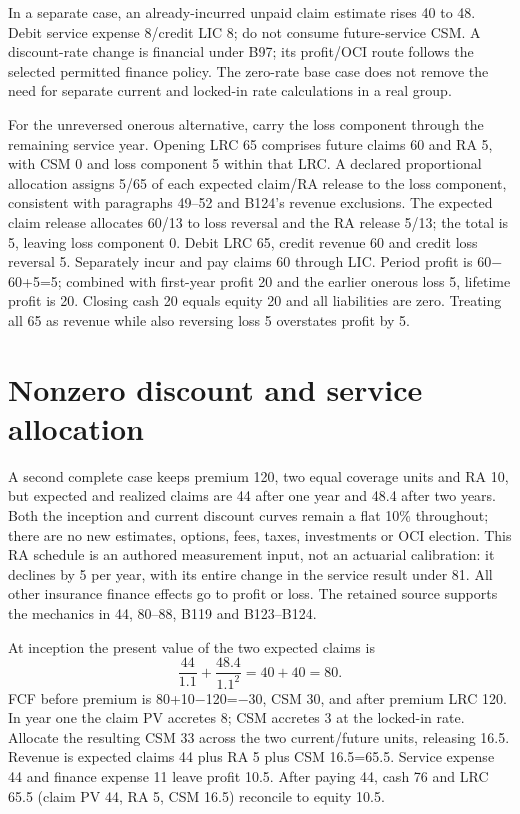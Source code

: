 In a separate case, an already-incurred unpaid claim estimate rises 40 to 48. Debit service expense 8/credit LIC 8; do not consume future-service CSM. A discount-rate change is financial under B97; its profit/OCI route follows the selected permitted finance policy. The zero-rate base case does not remove the need for separate current and locked-in rate calculations in a real group.

For the unreversed onerous alternative, carry the loss component through the remaining service year. Opening LRC 65 comprises future claims 60 and RA 5, with CSM 0 and loss component 5 within that LRC. A declared proportional allocation assigns 5/65 of each expected claim/RA release to the loss component, consistent with paragraphs 49--52 and B124's revenue exclusions. The expected claim release allocates 60/13 to loss reversal and the RA release 5/13; the total is 5, leaving loss component 0. Debit LRC 65, credit revenue 60 and credit loss reversal 5. Separately incur and pay claims 60 through LIC. Period profit is 60\ensuremath{-}60+5=5; combined with first-year profit 20 and the earlier onerous loss 5, lifetime profit is 20. Closing cash 20 equals equity 20 and all liabilities are zero. Treating all 65 as revenue while also reversing loss 5 overstates profit by 5.

\hypertarget{nonzero-discount-and-service-allocation}{%
\section{Nonzero discount and service allocation}\label{method-insurance-methods-nonzero-discount-and-service-allocation}}

A second complete case keeps premium 120, two equal coverage units and RA 10, but expected and realized claims are 44 after one year and 48.4 after two years. Both the inception and current discount curves remain a flat 10\% throughout; there are no new estimates, options, fees, taxes, investments or OCI election. This RA schedule is an authored measurement input, not an actuarial calibration: it declines by 5 per year, with its entire change in the service result under 81. All other insurance finance effects go to profit or loss. The retained source supports the mechanics in 44, 80--88, B119 and B123--B124.

At inception the present value of the two expected claims is
\[
 \frac{44}{1.1}+\frac{48.4}{1.1^2}=40+40=80.
\]
 FCF before premium is 80+10\ensuremath{-}120=\ensuremath{-}30, CSM 30, and after premium LRC 120. In year one the claim PV accretes 8; CSM accretes 3 at the locked-in rate. Allocate the resulting CSM 33 across the two current/future units, releasing 16.5. Revenue is expected claims 44 plus RA 5 plus CSM 16.5=65.5. Service expense 44 and finance expense 11 leave profit 10.5. After paying 44, cash 76 and LRC 65.5 (claim PV 44, RA 5, CSM 16.5) reconcile to equity 10.5.

